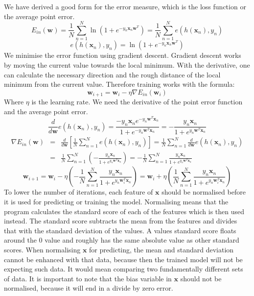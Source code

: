 We have derived a good form for the error measure, which is the loss function or the average point error.
\[ E_{in} \left( \mathbf{w} \right) = \frac{1}{N} \sum_{n=1}^N \ln \left( 1 + e^{-y_n \mathbf{x}_n \mathbf{w}^T} \right) = \frac{1}{N} \sum_{n=1}^N e \left( h \left( \mathbf{x}_n \right), y_n \right) \]
\[ e \left( h \left( \mathbf{x}_n \right), y_n \right) = \ln \left( 1 + e^{-y_n \mathbf{x}_n \mathbf{w}^T} \right) \]
We minimise the error function using gradient descent. Gradient descent works by moving the current value towards the local minimum. With the derivative, one can calculate the necessary direction and the rough distance of the local minimum from the current value. Therefore training works with the formula:
\[ \mathbf{w}_{i+1} = \mathbf{w}_i - \eta \nabla E_{in} \left( \mathbf{w}_i \right) \]
Where $\eta$ is the learning rate. We need the derivative of the point error function and the average point error.
\[ \frac{d}{d \mathbf{w}} e \left( h \left( \mathbf{x}_n \right), y_n \right) = \frac{-y_n \mathbf{x}_n e^{-y_n \mathbf{w}^T \mathbf{x}_n}}{1 + e^{-y_n \mathbf{w}^T \mathbf{x}_n}} = -\frac{y_n \mathbf{x}_n}{1 + e^{y_n \mathbf{w}^T \mathbf{x}_n}} \]
\begin{eqnarray*}
\nabla E_{in} \left( \mathbf{w} \right) & = & \frac{d}{d \mathbf{w}} \left[ \frac{1}{N} \sum_{n=1}^N e \left( h \left( \mathbf{x}_n \right), y_n \right) \right] = \frac{1}{N} \sum_{n=1}^N \frac{d}{d \mathbf{w}} e \left( h \left( \mathbf{x}_n \right), y_n \right) \\
& = & \frac{1}{N} \sum_{n=1}^N \left( -\frac{y_n \mathbf{x}_n}{1 + e^{y_n \mathbf{w}^T \mathbf{x}_n}} \right) = - \frac{1}{N} \sum_{n=1}^N \frac{y_n \mathbf{x}_n}{1 + e^{y_n \mathbf{w}^T \mathbf{x}_n}}
\end{eqnarray*}
\[ \mathbf{w}_{i+1} = \mathbf{w}_i - \eta \left( -\frac{1}{N} \sum_{n=1}^N \frac{y_n \mathbf{x}_n}{1 + e^{y_n \mathbf{w}_i^T \mathbf{x}_n}} \right) = \mathbf{w}_i + \eta \left( \frac{1}{N} \sum_{n=1}^N \frac{y_n \mathbf{x}_n}{1 + e^{y_n \mathbf{w}_i^T \mathbf{x}_n}} \right) \]
To lower the number of iterations, each feature of $\mathbf{x}$ should be normalised before it is used for predicting or training the model. Normalising means that the program calculates the standard score of each of the features which is then used instead. The standard score subtracts the mean from the features and divides that with the standard deviation of the values. A values standard score floats around the 0 value and roughly has the same absolute value as other standard scores. When normalising $\mathbf{x}$ for predicting, the mean and standard deviation cannot be enhanced with that data, because then the trained model will not be expecting such data. It would mean comparing two fundamentally different sets of data. It is important to note that the bias variable in $\mathbf{x}$ should not be normalised, because it will end in a divide by zero error.
